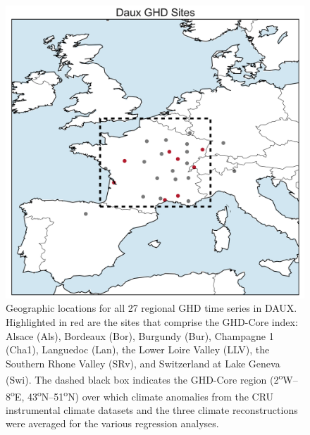 \documentclass[12pt]{article}
\begin{document}
\pagebreak

\renewcommand{\figurename}{Supplementary Figure}
\setcounter{figure}{0}

\begin{figure}
\center
\includegraphics[width=1.0\columnwidth,scale=2]{SUPP_fig_01_map_sites.png}
\caption{Geographic locations for all 27 regional GHD time series in DAUX. Highlighted in red are the sites that comprise the GHD-Core index: Alsace (Als), Bordeaux (Bor), Burgundy (Bur), Champagne 1 (Cha1), Languedoc (Lan), the Lower Loire Valley (LLV), the Southern Rhone Valley (SRv), and Switzerland at Lake Geneva (Swi). The dashed black box indicates the GHD-Core region (2\textsuperscript{o}W--8\textsuperscript{o}E, 43\textsuperscript{o}N--51\textsuperscript{o}N) over which climate anomalies from the CRU instrumental climate datasets and the three climate reconstructions were averaged for the various regression analyses.}
\end{figure}
\end{document}

